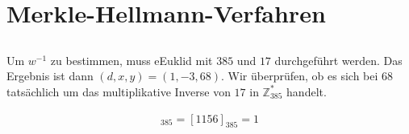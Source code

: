 \documentclass{../crypto}
\begin{document}
\subsection{}
\subsection{}
\subsection{}

\section{Merkle-Hellmann-Verfahren}

%
%
%
%
%

\subsection{}
Um $w^{-1}$ zu bestimmen, muss eEuklid mit $385$ und $17$ durchgeführt werden. Das
Ergebnis ist dann $(d,x,y) = (1,-3,68)$. Wir überprüfen, ob es sich bei $68$
tatsächlich um das multiplikative Inverse von $17$ in $\mathbb{Z}_{385}^*$ handelt.

\begin{align*}
   [17 \cdot 68]_{385} = [1156]_{385} = 1
\end{align*}
\end{document}
